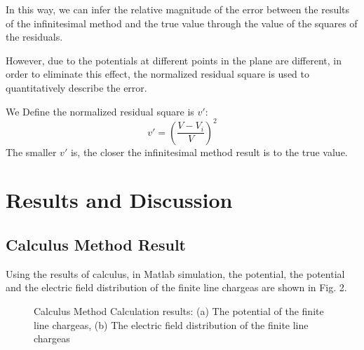 \documentclass[journal,twocolumn,letterpaper]{IEEEJERM}
\begin{document}
In this way, we can infer the relative magnitude of the error between the results of the infinitesimal method and the true value through the value of the squares of the residuals.

However, due to the potentials at different points in the plane are different, in order to eliminate this effect, the normalized residual square is used to quantitatively describe the error.

We Define the normalized residual square is $v'$: $$v'=(\dfrac{V-V_i}{V})^2$$
The smaller $v'$ is, the closer the infinitesimal method result is to the true value.


\section{Results and Discussion}
\subsection{Calculus Method Result}
Using the results of calculus, in Matlab simulation, the potential, the potential and the electric field distribution of the finite line chargeas are shown in Fig. 2. 


\begin{figure}[H]   
	\centering	  
	    \label{1a}\hfill	  
	\label{1b}
	\caption{Calculus Method Calculation results: (a) The potential of the finite line chargeas, (b) The electric field distribution of the finite line chargeas}	  
	\label{fig1} 
\end{figure}
\end{document}
